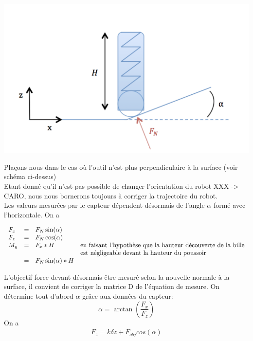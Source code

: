 \documentclass[12pt,twoside,a4paper]{article}
\begin{document}
\begin{center}
\includegraphics[scale=0.5]{schema_Kalman.png}
\end{center}


\vspace{1cm}
Plaçons nous dans le cas où l'outil n'est plus perpendiculaire à la surface (voir schéma ci-dessus)\\

Etant donné qu'il n'est pas possible de changer l'orientation du robot XXX -> CARO, nous nous bornerons toujours à corriger la trajectoire du robot. \\

\vspace{1cm}
Les valeurs mesurées par le capteur dépendent désormais de l'angle $\alpha$ formé avec l'horizontale. On a 

$$
\begin{array}{lllll}
F_x &=& F_N \sin(\alpha) &\\
F_z &=& F_N \cos(\alpha) &\\
M_y &= &F_x*H & \text{en faisant l'hypothèse que la hauteur découverte de la bille} \\ 
	&&& \text{est négligeable devant la hauteur du poussoir} \\
	&= &F_N \sin(\alpha)*H &
	\begin{array}[t]{l}
	
	\end{array}
\end{array}
$$

L'objectif force devant désormais être mesuré selon la nouvelle normale à la surface, il convient de corriger la matrice D de l'équation de mesure.
On détermine tout d'abord $\alpha$ grâce aux données du capteur:
$$ \alpha = \arctan(\frac{F_{x}}{F_{z}}) $$
On a 
$$
\begin{array}{lll}
F_{z} = k \delta z + F_{obj} cos(\alpha)
\end{array}
$$
\end{document}
